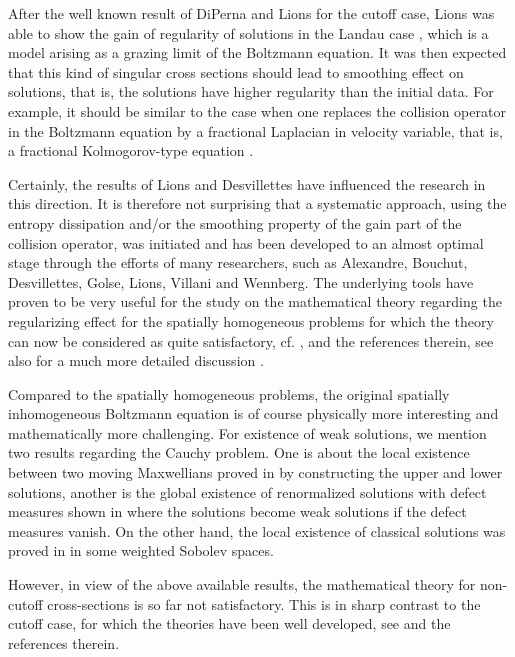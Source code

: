 \documentclass{amsart}[12pt, article]
\begin{document}
After the well known result of DiPerna and Lions \cite{D-L} for the cutoff case, Lions was able to show the gain of regularity of solutions in the Landau case \cite{lions-landau},
which is a model arising as a grazing limit of the Boltzmann equation. It was then expected that this kind of singular cross sections should lead to smoothing
effect on solutions, that is, the solutions have higher regularity
than the initial data. For example, it should be similar to
the case when one replaces the
collision operator in the Boltzmann equation
by a fractional Laplacian in velocity variable, that is, a fractional Kolmogorov-type equation
\cite{M-X}.

Certainly, the results of Lions \cite{Lions98} and Desvillettes  have influenced
the  research in this direction. It is therefore not surprising that a systematic approach, using the entropy
dissipation and/or the smoothing property of the gain part of the
collision operator, was initiated and has
been developed to an almost optimal stage through the efforts of many researchers, such as Alexandre, Bouchut, Desvillettes,
Golse, Lions,
Villani and Wennberg.
The underlying tools have proven to be very useful for the
study on the mathematical theory
 regarding the regularizing effect
for the spatially homogeneous problems for which the theory can now be considered as quite
satisfactory, cf.
\cite{al-1,al-saf,al-3,chen-li-xu1,
desv-F,Des-Fu-Ter,desv-wen1,HMUY,MU,MUXY-DCDS,villani},
and the references therein, see also for a much more detailed discussion \cite{alex-review}.

Compared to the spatially homogeneous problems, the original
spatially inhomogeneous Boltzmann equation is of course physically
more interesting and mathematically more challenging. For existence
of weak solutions, we mention two
results regarding the Cauchy problem. One is about
the local existence between two moving Maxwellians  proved in
\cite{alex-two-maxwellian} by constructing the upper and lower
solutions, another is   the global existence of renormalized solutions
with defect measures shown in \cite{al-3} where
the solutions become weak solutions if the defect measures vanish.
On the other hand, the local existence
of classical solutions was proved in \cite{amuxy-nonlinear-3} in some
weighted Sobolev spaces.

However, in view of the above available results, the mathematical
theory for non-cutoff
cross-sections is so far not satisfactory. This is in sharp contrast to the cutoff case, for which the theories have been well
developed, see \cite{BD,bouchut-1,desv,D-L,dly,guo-1,liu-1,liu-2,ukai-1a,ukai-1b, ukai-2} and the references therein.
\end{document}

